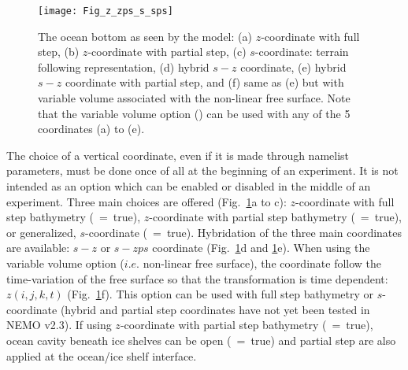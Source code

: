 \documentclass[NEMO_book]{subfiles}
\begin{document}
{%
\begin{figure}[!tb]    \begin{center}
\texttt{[image: Fig\_z\_zps\_s\_sps]}
\caption{  \label{Fig_z_zps_s_sps}   
The ocean bottom as seen by the model: 
(a) $z$-coordinate with full step, 
(b) $z$-coordinate with partial step, 
(c) $s$-coordinate: terrain following representation, 
(d) hybrid $s-z$ coordinate, 
(e) hybrid $s-z$ coordinate with partial step, and 
(f) same as (e) but with variable volume associated with the non-linear free surface. 
Note that the variable volume option () can be used with any of the 
5 coordinates (a) to (e).}
\end{center}   \end{figure}

The choice of a vertical coordinate, even if it is made through  namelist parameters, 
must be done once of all at the beginning of an experiment. It is not intended as an 
option which can be enabled or disabled in the middle of an experiment. Three main 
choices are offered (Fig.~\ref{Fig_z_zps_s_sps}a to c): $z$-coordinate with full step 
bathymetry (~=~true), $z$-coordinate with partial step bathymetry 
(~=~true), or generalized, $s$-coordinate (~=~true). 
Hybridation of the three main coordinates are available: $s-z$ or $s-zps$ coordinate 
(Fig.~\ref{Fig_z_zps_s_sps}d and \ref{Fig_z_zps_s_sps}e). When using the variable 
volume option  ($i.e.$ non-linear free surface), the coordinate follow the 
time-variation of the free surface so that the transformation is time dependent: 
$z(i,j,k,t)$ (Fig.~\ref{Fig_z_zps_s_sps}f). This option can be used with full step 
bathymetry or $s$-coordinate (hybrid and partial step coordinates have not 
yet been tested in NEMO v2.3). If using $z$-coordinate with partial step bathymetry
(~=~true), ocean cavity beneath ice shelves can be open (~=~true) 
and partial step are also applied at the ocean/ice shelf interface. 

}
\end{document}
